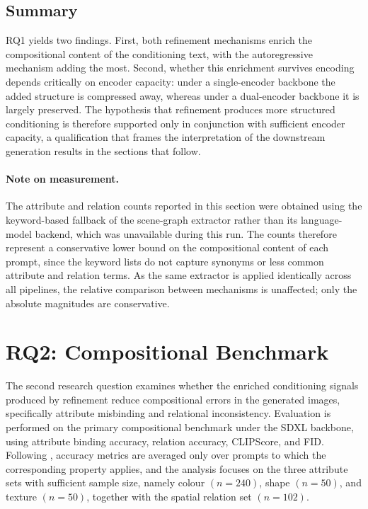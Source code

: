\documentclass[a4paper,twoside,12pt]{report}
\begin{document}
\subsection{Summary}

RQ1 yields two findings. First, both refinement mechanisms enrich the
compositional content of the conditioning text, with the autoregressive
mechanism adding the most. Second, whether this enrichment survives encoding
depends critically on encoder capacity: under a single-encoder backbone the
added structure is compressed away, whereas under a dual-encoder backbone it is
largely preserved. The hypothesis that refinement produces more structured
conditioning is therefore supported only in conjunction with sufficient encoder
capacity, a qualification that frames the interpretation of the downstream
generation results in the sections that follow.

\paragraph{Note on measurement.} The attribute and relation counts reported in
this section were obtained using the keyword-based fallback of the scene-graph
extractor rather than its language-model backend, which was unavailable during
this run. The counts therefore represent a conservative lower bound on the
compositional content of each prompt, since the keyword lists do not capture
synonyms or less common attribute and relation terms. As the same extractor is
applied identically across all pipelines, the relative comparison between
mechanisms is unaffected; only the absolute magnitudes are conservative.

\section{RQ2: Compositional Benchmark}
\label{sec:rq2}

The second research question examines whether the enriched conditioning
signals produced by refinement reduce compositional errors in the generated
images, specifically attribute misbinding and relational inconsistency.
Evaluation is performed on the primary compositional benchmark under the SDXL
backbone, using attribute binding accuracy, relation accuracy, CLIPScore, and
FID. Following , accuracy metrics are averaged only over prompts
to which the corresponding property applies, and the analysis focuses on the
three attribute sets with sufficient sample size, namely colour \((n = 240)\),
shape \((n = 50)\), and texture \((n = 50)\), together with the spatial
relation set \((n = 102)\).
\end{document}
